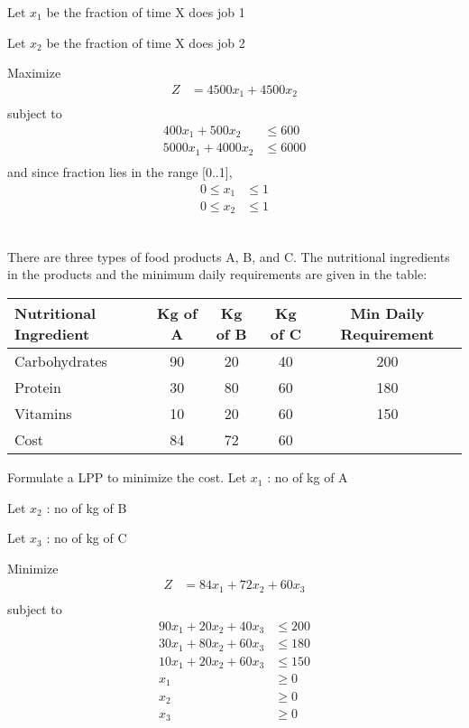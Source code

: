 \documentclass[12pt]{article}
\begin{document}
Let $x_1$ be the fraction of time X does job 1

Let $x_2$ be the fraction of time X does job 2

Maximize
\begin{align*}
Z&=4500x_1 + 4500 x_2  \\
\end{align*}
subject to
\begin{align*}
400x_1+500x_2&\le 600  \\
5000x_1+4000x_2&\le 6000  \\
\end{align*}
and since fraction lies in the range [0..1],
\begin{align*}
0\le x_1&\le 1  \\
0\le x_2&\le 1  \\
\end{align*}
\subsection{}

   There are three types of food products A, B, and C. The nutritional ingredients in the products and the minimum daily requirements are given in the table:

\begin{center}
\begin{tabular}{|l|c|c|c|c|}
\hline
 Nutritional Ingredient  &  Kg of A  &  Kg of B  &  Kg of C  &  Min Daily Requirement  \\
\hline
 Carbohydrates           &       90  &       20  &       40  &                    200  \\
 Protein                 &       30  &       80  &       60  &                    180  \\
 Vitamins                &       10  &       20  &       60  &                    150  \\
\hline
 Cost                    &       84  &       72  &       60  &                         \\
\hline
\end{tabular}
\end{center}



Formulate a LPP to minimize the cost.
Let $x_1$ : no of kg of A

Let $x_2$ : no of kg of B

Let $x_3$ : no of kg of C

Minimize
\begin{align*}
Z                 & =84x_1+72x_2+60x_3 \\
\end{align*}
subject to
\begin{align*}
90x_1+20x_2+40x_3 & \le 200            \\
30x_1+80x_2+60x_3 & \le 180            \\
10x_1+20x_2+60x_3 & \le 150            \\
x_1               & \ge 0              \\
x_2               & \ge 0              \\
x_3               & \ge 0 
\end{align*}
\end{document}
